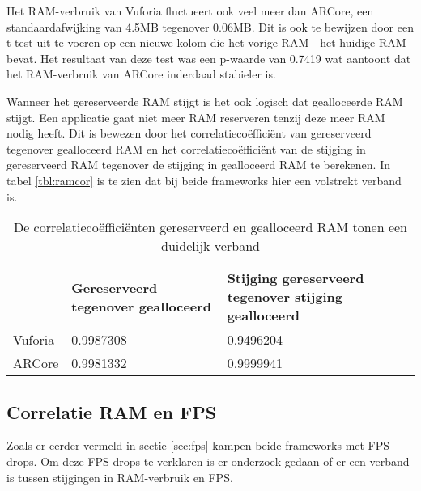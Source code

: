 Het RAM-verbruik van Vuforia fluctueert ook veel meer dan ARCore, een standaardafwijking van 4.5MB tegenover 0.06MB. Dit is ook te bewijzen door een t-test uit te voeren op een nieuwe kolom die het vorige RAM - het huidige RAM bevat. Het resultaat van deze test was een p-waarde van 0.7419 wat aantoont dat het RAM-verbruik van ARCore inderdaad stabieler is.

Wanneer het gereserveerde RAM stijgt is het ook logisch dat gealloceerde RAM stijgt. Een applicatie gaat niet meer RAM reserveren tenzij deze meer RAM nodig heeft. Dit is bewezen door het correlatiecoëfficiënt van gereserveerd tegenover gealloceerd RAM en het correlatiecoëfficiënt van de stijging in gereserveerd RAM tegenover de stijging in gealloceerd RAM te berekenen. In tabel \ref{tbl:ramcor} is te zien dat bij beide frameworks hier een volstrekt verband is.

\begin{table}[]
    \begin{tabular}{@{}l|l|l@{}}
        & Gereserveerd tegenover gealloceerd & Stijging gereserveerd tegenover stijging gealloceerd \\ \midrule
        Vuforia & 0.9987308                          & 0.9496204                                            \\
        ARCore  & 0.9981332                          & 0.9999941                                           
    \end{tabular}
 \caption{De correlatiecoëfficiënten gereserveerd en gealloceerd RAM tonen een duidelijk verband}
\end{table}

\subsection{Correlatie RAM en FPS}
Zoals er eerder vermeld in sectie \ref{sec:fps} kampen beide frameworks met FPS drops. Om deze FPS drops te verklaren is er onderzoek gedaan of er een verband is tussen stijgingen in RAM-verbruik en FPS.


